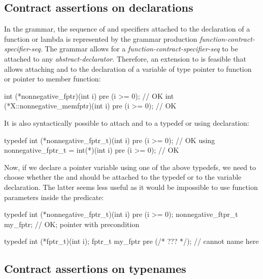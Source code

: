 \subsection{Contract assertions on declarations}

In the \cite{P2900R8} grammar, the sequence of  and  specifiers attached to the declaration of a function or lambda is represented by the grammar production \emph{function-contract-specifier-seq}. The grammar allows for a \emph{function-contract-specifier-seq} to be attached to any \emph{abstract-declarator}. Therefore, an extension to \cite{P2900R8} is feasible that allows attaching  and  to the declaration of a variable of type pointer to function or pointer to member function:
\begin{codeblock}
int (*nonnegative_fptr)(int i) pre (i >= 0);        // OK
int (*X::nonnegative_memfptr)(int i) pre (i >= 0);  // OK
\end{codeblock}
It is also syntactically possible to attach  and  to a typedef or using declaration:
\begin{codeblock}
typedef int (*nonnegative_fptr_t)(int i) pre (i >= 0);  // OK
using nonnegative_fptr_t = int(*)(int i) pre (i >= 0);  // OK
\end{codeblock}
Now, if we declare a pointer variable using one of the above typedefs, we need to choose whether the   and  should be attached to the typedef or to the variable declaration. The latter seems less useful as it would be impossible to use function parameters inside the predicate:
\begin{codeblock}
typedef int (*nonnegative_fptr_t)(int i) pre (i >= 0);  
nonnegative_ftpr_t my_fptr;  // OK; pointer with precondition

typedef int (*fptr_t)(int i);
fptr_t my_fptr pre (/* ??? */);  // cannot name  here
\end{codeblock}

\subsection{Contract assertions on typenames}


